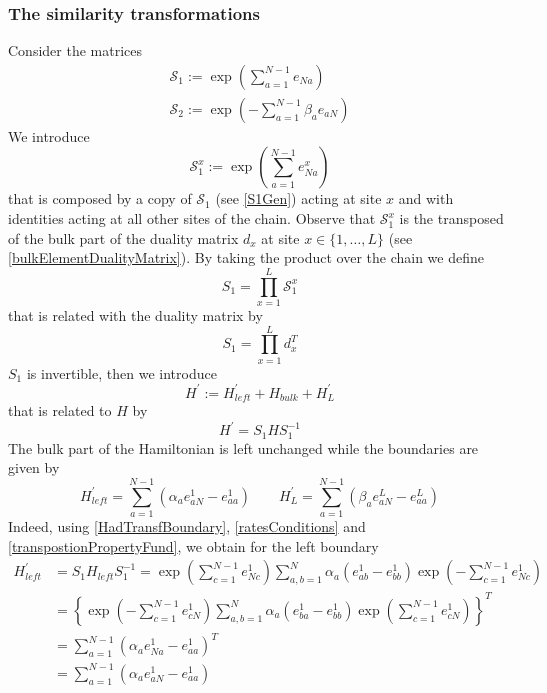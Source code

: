 \documentclass[10pt]{article}
\numberwithin{equation}{section}
\numberwithin{equation}{subsection}
\begin{document}
\subsubsection{The similarity transformations}\label{subsectionSTransf}
Consider the matrices
\begin{align}
	\mathcal{S}_{1}:=\exp{\left(\sum_{a=1}^{N-1}e_{Na}\right)}\label{S1Gen}\\
	\mathcal{S}_{2}:=\exp{\left(-\sum_{a=1}^{N-1}\beta_{a}e_{aN}\right)}\label{S2Gen}
\end{align}
We introduce
\begin{equation}\label{transformationV}
 \mathcal{S}_{1}^{x}:=\exp{\left(\sum_{a=1}^{N-1}e_{Na}^{x}\right)}%
\end{equation}
that is composed by a copy of $\mathcal{S}_{1}$ (see \eqref{S1Gen}) acting at site $x$ and with identities acting at all other sites of the chain. 
Observe that $\mathcal{S}_{1}^{x}$ is the transposed of the bulk part of the duality matrix $d_{x}$  at site $x\in \{1,\ldots,L\}$ (see \eqref{bulkElementDualityMatrix}). By taking the product over the chain we define
\begin{equation}\label{S1-Whole}
    S_{1}=\prod_{x=1}^{L}\mathcal{S}_{1}^{x}
\end{equation}
that is related with the duality matrix by 
\begin{equation}
S_{1}=\prod_{x=1}^{L}d_{x}^{T}
\end{equation}
 $S_{1}$ is invertible, then we introduce 
\begin{equation}\label{hatHamiltonian}
   H^{'}:=H^{'}_{left}+H_{bulk}+H^{'}_{L}
\end{equation}
that is related to $H$ by
\begin{equation}\label{similarV}
   H^{'}=S_{1}HS_{1}^{-1}
\end{equation}
The bulk part of the Hamiltonian is left unchanged while the boundaries are given by 
\begin{equation}
	H^{'}_{left}=\sum_{a=1}^{N-1}\left(\alpha_{a}e_{aN}^{1}-e_{aa}^{1}\right)\qquad H^{'}_{L}=\sum_{a=1}^{N-1}\left(\beta_{a}e_{aN}^{L}-e_{aa}^{L}\right)
\end{equation}
Indeed, using \eqref{HadTransfBoundary}, \eqref{ratesConditions} and \eqref{transpostionPropertyFund}, we obtain for the left boundary
\begin{equation}
	\begin{split}
		H_{left}^{'}&=S_{1}H_{left}S_{1}^{-1}=\exp{\left(\sum_{c=1}^{N-1}e_{Nc}^{1}\right)}\sum_{a,b=1}^{N}\alpha_{a}\left(e_{ab}^{1}-e_{bb}^{1}\right)\exp{\left(-\sum_{c=1}^{N-1}e_{Nc}^{1}\right)}
		\\&=
		\left\{\exp{\left(-\sum_{c=1}^{N-1}e_{cN}^{1}\right)}\sum_{a,b=1}^{N}\alpha_{a}\left(e_{ba}^{1}-e_{bb}^{1}\right)\exp{\left(\sum_{c=1}^{N-1}e_{cN}^{1}\right)}\right\}^{T}
		\\&=
		\sum_{a=1}^{N-1}\left(\alpha_{a}e_{Na}^{1}-e_{aa}^{1}\right)^{T}
		\\&=
		\sum_{a=1}^{N-1}\left(\alpha_{a}e_{aN}^{1}-e_{aa}^{1}\right)
	\end{split}
\end{equation}
\end{document}
